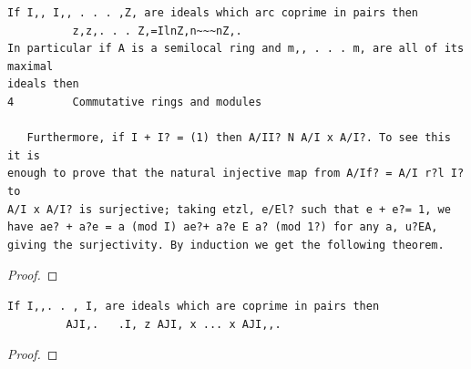 \begin{theorem}\label{mcrt-auto-theorem-1-3}\uses{}
\begin{verbatim}
If I,, I,, . . . ,Z, are ideals which arc coprime in pairs then
          z,z,. . . Z,=IlnZ,n~~~nZ,.
In particular if A is a semilocal ring and m,, . . . m, are all of its maximal
ideals then
4         Commutative rings and modules

   Furthermore, if I + I? = (1) then A/II? N A/I x A/I?. To see this it is
enough to prove that the natural injective map from A/If? = A/I r?l I? to
A/I x A/I? is surjective; taking etzl, e/El? such that e + e?= 1, we
have ae? + a?e = a (mod I) ae?+ a?e E a? (mod 1?) for any a, u?EA,
giving the surjectivity. By induction we get the following theorem.
\end{verbatim}
\end{theorem}
\begin{proof}
\notready
\end{proof}


\begin{theorem}\label{mcrt-auto-theorem-1-4}\uses{}
\begin{verbatim}
If I,,. . , I, are ideals which are coprime in pairs then
         AJI,.   .I, z AJI, x ... x AJI,,.
\end{verbatim}
\end{theorem}
\begin{proof}
\notready
\end{proof}


